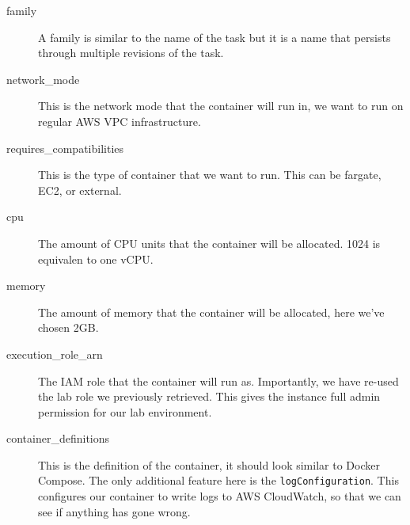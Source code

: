 \documentclass{csse4400}
\begin{document}


\begin{description}
    \item[family] A family is similar to the name of the task but it is a name that persists through multiple revisions of the task.
    \item[network\_mode] This is the network mode that the container will run in, we want to run on regular AWS VPC infrastructure.
    \item[requires\_compatibilities] This is the type of container that we want to run. This can be fargate, EC2, or external.
    \item[cpu] The amount of CPU units that the container will be allocated. 1024 is equivalen to one vCPU.
    \item[memory] The amount of memory that the container will be allocated, here we've chosen 2GB.
    \item[execution\_role\_arn] The IAM role that the container will run as.
        Importantly, we have re-used the lab role we previously retrieved.
        This gives the instance full admin permission for our lab environment.
    \item[container\_definitions] This is the definition of the container, it should look similar to Docker Compose.
        The only additional feature here is the \texttt{logConfiguration}.
        This configures our container to write logs to AWS CloudWatch, so that we can see if anything has gone wrong.
\end{description}
\end{document}
